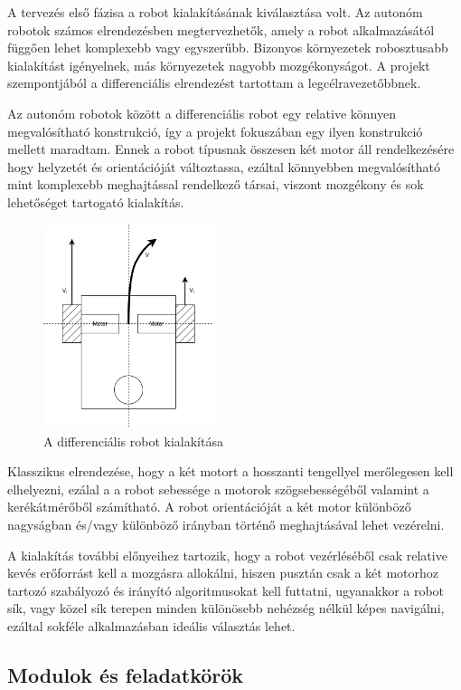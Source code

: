 A tervezés első fázisa a robot kialakításának kiválasztása volt. Az autonóm
robotok számos elrendezésben megtervezhetők, amely a robot alkalmazásától függően
lehet komplexebb vagy egyszerűbb. Bizonyos környezetek robosztusabb kialakítást
igényelnek, más környezetek nagyobb mozgékonyságot. A projekt szempontjából a
differenciális elrendezést tartottam a legcélravezetőbbnek.

Az autonóm robotok között a differenciális robot egy relative könnyen
megvalósítható konstrukció, így a projekt fokuszában egy ilyen konstrukció
mellett maradtam. Ennek a robot típusnak összesen két motor áll rendelkezésére
hogy helyzetét és orientációját változtassa, ezáltal könnyebben megvalósítható
mint komplexebb meghajtással rendelkező társai, viszont mozgékony és sok
lehetőséget tartogató kialakítás.

\begin{figure}
  \centering
  \includegraphics[width=50mm, keepaspectratio]{figures/ch2/diff_robot.png}
  \caption{A differenciális robot kialakítása}
  \label{fig:diff-robot}
\end{figure}

Klasszikus elrendezése, hogy a két motort a hosszanti tengellyel merőlegesen kell
elhelyezni, ezálal a a robot sebessége a motorok szögsebességéből valamint a
kerékátmérőből számítható. A robot orientációját a két motor különböző nagyságban
és/vagy különböző irányban történő meghajtásával lehet vezérelni.

A kialakítás további előnyeihez tartozik, hogy a robot vezérléséből csak relative
kevés erőforrást kell a mozgásra allokálni, hiszen pusztán csak a két motorhoz
tartozó szabályozó és irányító algoritmusokat kell futtatni, ugyanakkor a robot
sík, vagy közel sík terepen minden különösebb nehézség nélkül képes navigálni,
ezáltal sokféle alkalmazásban ideális választás lehet.

\subsection{Modulok és feladatkörök}


